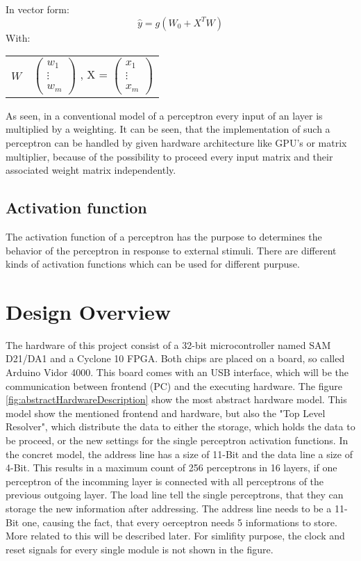 \documentclass{article}
\makeatletter
\numberwithin{equation}{section}
\newenvironment{conditions}
{\par\vspace{\abovedisplayskip}
\noindent\begin{tabular}{>{$}l<{$} @{${}={}$} l}}
        {\end{tabular}\par\vspace{\belowdisplayskip}}
\makeatother
\begin{document}
In vector form:
\begin{equation}
    \hat y = g(W_0 + X^TW)
\end{equation}
With:
\begin{conditions}
    W & $\begin{pmatrix} w_1 \\ \vdots \\ w_m \end{pmatrix}$ , X = $\begin{pmatrix} x_1 \\ \vdots \\ x_m \end{pmatrix}$
\end{conditions}
As seen, in a conventional model of a perceptron every input of an
layer is multiplied by a weighting. It can be seen, that the implementation
of such a perceptron can be handled by given hardware architecture like GPU's
or matrix multiplier, because of the possibility to proceed every input matrix
and their associated weight matrix independently.

\subsection{Activation function}
The activation function of a perceptron has the purpose to determines the
behavior of the perceptron in response to external stimuli. There are different
kinds of activation functions which can be used for different purpuse.

\pagebreak
\section{Design Overview}
The hardware of this project consist of a 32-bit microcontroller named SAM D21/DA1 and a
Cyclone 10 FPGA. Both chips are placed on a board, so called Arduino Vidor 4000. This board
comes with an USB interface, which will be the communication between frontend (PC) and
the executing hardware. The figure \ref{fig:abstractHardwareDescription} show the most
abstract hardware model. This model show the mentioned frontend and hardware, but also the
"Top Level Resolver", which distribute the data to either the storage, which holds the data to
be proceed, or the new settings for the single perceptron activation functions. In the concret
model, the address line has a size of 11-Bit and the data line a size of 4-Bit. This results
in a maximum count of 256 perceptrons in 16 layers, if one perceptron of the incomming layer
is connected with all perceptrons of the previous outgoing layer. The load line tell the single
perceptrons, that they can storage the new information after addressing. The address line needs to be a
11-Bit one, causing the fact, that every oerceptron needs 5 informations to store. More related to this
will be described later. For simlifity purpose, the clock and reset signals for every single module
is not shown in the figure.
\end{document}
